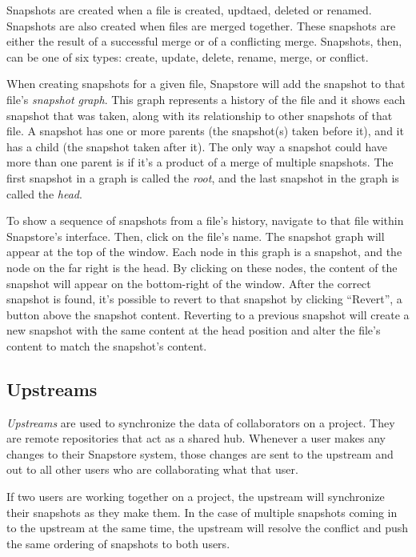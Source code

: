 Snapshots are created when a file is created, updtaed, deleted or renamed. Snapshots are also created when files are merged together. These snapshots are either the result of a successful merge or of a conflicting merge. Snapshots, then, can be one of six types: create, update, delete, rename, merge, or conflict.

When creating snapshots for a given file, Snapstore will add the snapshot to that file's \textit{snapshot graph}. This graph represents a history of the file and it shows each snapshot that was taken, along with its relationship to other snapshots of that file. A snapshot has one or more parents (the snapshot(s) taken before it), and it has a child (the snapshot taken after it). The only way a snapshot could have more than one parent is if it's a product of a merge of multiple snapshots. The first snapshot in a graph is called the \textit{root}, and the last snapshot in the graph is called the \textit{head}.

To show a sequence of snapshots from a file's history, navigate to that file within Snapstore's interface. Then, click on the file's name. The snapshot graph will appear at the top of the window. Each node in this graph is a snapshot, and the node on the far right is the head. By clicking on these nodes, the content of the snapshot will appear on the bottom-right of the window. After the correct snapshot is found, it's possible to revert to that snapshot by clicking ``Revert'', a button above the snapshot content. Reverting to a previous snapshot will create a new snapshot with the same content at the head position and alter the file's content to match the snapshot's content.

\subsection{Upstreams}

\textit{Upstreams} are used to synchronize the data of collaborators on a project. They are remote repositories that act as a shared hub. Whenever a user makes any changes to their Snapstore system, those changes are sent to the upstream and out to all other users who are collaborating what that user.

If two users are working together on a project, the upstream will synchronize their snapshots as they make them. In the case of multiple snapshots coming in to the upstream at the same time, the upstream will resolve the conflict and push the same ordering of snapshots to both users.

